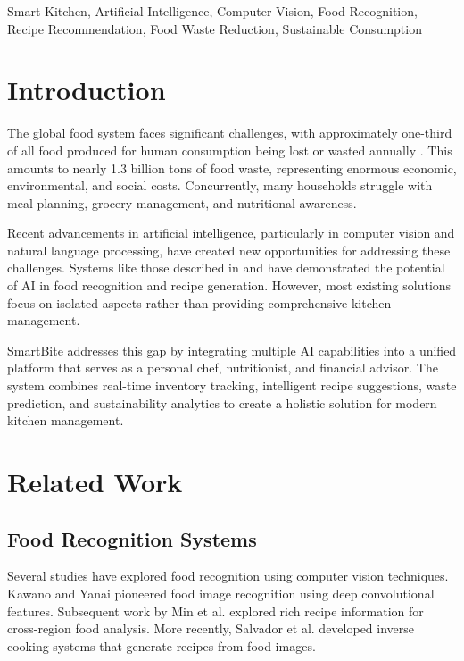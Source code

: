 \documentclass[conference]{IEEEtran}
\begin{document}
\begin{IEEEkeywords}
Smart Kitchen, Artificial Intelligence, Computer Vision, Food Recognition, Recipe Recommendation, Food Waste Reduction, Sustainable Consumption
\end{IEEEkeywords}

\section{Introduction}
The global food system faces significant challenges, with approximately one-third of all food produced for human consumption being lost or wasted annually \cite{gustavsson2011global}. This amounts to nearly 1.3 billion tons of food waste, representing enormous economic, environmental, and social costs. Concurrently, many households struggle with meal planning, grocery management, and nutritional awareness.

Recent advancements in artificial intelligence, particularly in computer vision and natural language processing, have created new opportunities for addressing these challenges. Systems like those described in \cite{salvador2019inverse} and \cite{marin2021recipe1m} have demonstrated the potential of AI in food recognition and recipe generation. However, most existing solutions focus on isolated aspects rather than providing comprehensive kitchen management.

SmartBite addresses this gap by integrating multiple AI capabilities into a unified platform that serves as a personal chef, nutritionist, and financial advisor. The system combines real-time inventory tracking, intelligent recipe suggestions, waste prediction, and sustainability analytics to create a holistic solution for modern kitchen management.

\section{Related Work}

\subsection{Food Recognition Systems}
Several studies have explored food recognition using computer vision techniques. Kawano and Yanai \cite{kawano2014food} pioneered food image recognition using deep convolutional features. Subsequent work by Min et al. \cite{min2017you} explored rich recipe information for cross-region food analysis. More recently, Salvador et al. \cite{salvador2019inverse} developed inverse cooking systems that generate recipes from food images.
\end{document}
